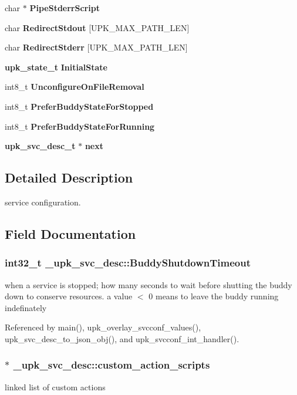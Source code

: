\begin{DoxyCompactItemize}
char $\ast$ {\bf PipeStderrScript}
\item 
char {\bf RedirectStdout} [UPK\_\-MAX\_\-PATH\_\-LEN]
\item 
char {\bf RedirectStderr} [UPK\_\-MAX\_\-PATH\_\-LEN]
\item 
{\bf upk\_\-state\_\-t} {\bf InitialState}
\item 
int8\_\-t {\bf UnconfigureOnFileRemoval}
\item 
int8\_\-t {\bf PreferBuddyStateForStopped}
\item 
int8\_\-t {\bf PreferBuddyStateForRunning}
\item 
{\bf upk\_\-svc\_\-desc\_\-t} $\ast$ {\bf next}
\end{DoxyCompactItemize}


\subsection{Detailed Description}
service configuration. 

\subsection{Field Documentation}
\subsubsection[{BuddyShutdownTimeout}]{\setlength{\rightskip}{0pt plus 5cm}int32\_\-t {\bf \_\-upk\_\-svc\_\-desc::BuddyShutdownTimeout}}\label{struct__upk__svc__desc_ab23ddf0afd126034c447f7766f8b5588}
when a service is stopped; how many seconds to wait before shutting the buddy down to conserve resources. a value $<$ 0 means to leave the buddy running indefinately 

Referenced by main(), upk\_\-overlay\_\-svcconf\_\-values(), upk\_\-svc\_\-desc\_\-to\_\-json\_\-obj(), and upk\_\-svcconf\_\-int\_\-handler().

\subsubsection[{custom\_\-action\_\-scripts}]{$\ast$ {\bf \_\-upk\_\-svc\_\-desc::custom\_\-action\_\-scripts}}\label{struct__upk__svc__desc_abbf41417e2cc90644f9a7a035d551dcf}
linked list of custom actions 

